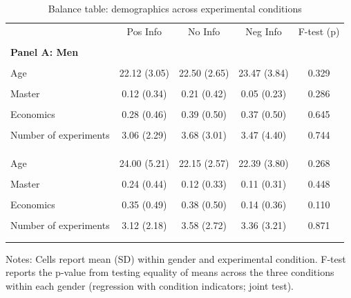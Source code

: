 \begin{table}[htbp]\centering
\caption{Balance table: demographics across experimental conditions}
\label{tab:balance_demo}
\begin{threeparttable}
\begin{tabular}{lcccc}
\toprule
 & Pos Info & No Info & Neg Info & F-test (p) \\\\
\midrule
\multicolumn{5}{l}{\textbf{Panel A: Men}} \\\\
\addlinespace
Age & 22.12 (3.05) & 22.50 (2.65) & 23.47 (3.84) & 0.329 \\\\
Master & 0.12 (0.34) & 0.21 (0.42) & 0.05 (0.23) & 0.286 \\\\
Economics & 0.28 (0.46) & 0.39 (0.50) & 0.37 (0.50) & 0.645 \\\\
Number of experiments & 3.06 (2.29) & 3.68 (3.01) & 3.47 (4.40) & 0.744 \\\\
\addlinespace
\multicolumn{5}{l}{\textbf{Panel B: Women}} \\\\
\addlinespace
Age & 24.00 (5.21) & 22.15 (2.57) & 22.39 (3.80) & 0.268 \\\\
Master & 0.24 (0.44) & 0.12 (0.33) & 0.11 (0.31) & 0.448 \\\\
Economics & 0.35 (0.49) & 0.38 (0.50) & 0.14 (0.36) & 0.110 \\\\
Number of experiments & 3.12 (2.18) & 3.58 (2.72) & 3.36 (3.21) & 0.871 \\\\
\addlinespace
\bottomrule
\end{tabular}
\begin{tablenotes}\footnotesize
\item Notes: Cells report mean (SD) within gender and experimental condition. F-test reports the p-value from testing equality of means across the three conditions within each gender (regression with condition indicators; joint test).
\end{tablenotes}
\end{threeparttable}
\end{table}
